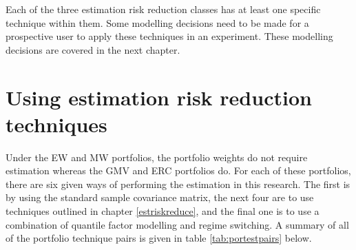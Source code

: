 \documentclass[
]{article}
\begin{document}
Each of the three estimation risk reduction classes has at least one specific technique within them.
Some modelling decisions need to be made for a prospective user to apply these techniques in an
experiment. These modelling decisions are covered in the next chapter.

\hypertarget{somemaths}{%
\section{Using estimation risk reduction techniques}\label{somemaths}}

Under the EW and MW portfolios, the portfolio weights do not require estimation whereas the GMV and ERC
portfolios do. For each of these portfolios, there are six given ways of performing the estimation in
this research. The first is by using the standard sample covariance matrix, the next four are to use
techniques outlined in chapter \ref{estriskreduce}, and the final one is to use a combination of
quantile factor modelling and regime switching. A summary of all of the portfolio technique pairs is
given in table \ref{tab:portestpairs} below.
\end{document}
